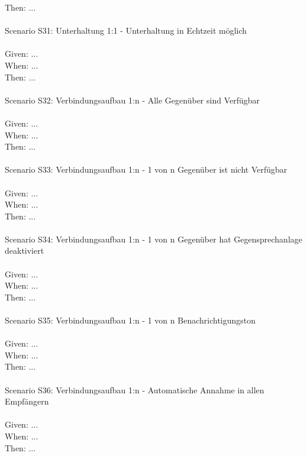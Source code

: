 \begin{tabbing}
    Then:   \> \> \> ...\\
    \\
    Scenario S31: \> \> \> Unterhaltung 1:1 - Unterhaltung in Echtzeit möglich \\ \\
    Given:  \> \> \> ...\\
    When:   \> \> \> ...\\
    Then:   \> \> \> ...\\
    \\
    Scenario S32: \> \> \> Verbindungsaufbau 1:n - Alle Gegenüber sind Verfügbar \\ \\
    Given:  \> \> \> ...\\
    When:   \> \> \> ...\\
    Then:   \> \> \> ...\\
    \\
    Scenario S33: \> \> \> Verbindungsaufbau 1:n - 1 von n Gegenüber ist nicht Verfügbar \\ \\
    Given:  \> \> \> ...\\
    When:   \> \> \> ...\\
    Then:   \> \> \> ...\\
    \\
    Scenario S34: \> \> \> Verbindungsaufbau 1:n - 1 von n Gegenüber hat Gegensprechanlage deaktiviert \\ \\
    Given:  \> \> \> ...\\
    When:   \> \> \> ...\\
    Then:   \> \> \> ...\\
    \\
    Scenario S35: \> \> \> Verbindungsaufbau 1:n - 1 von n Benachrichtigungston \\ \\
    Given:  \> \> \> ...\\
    When:   \> \> \> ...\\
    Then:   \> \> \> ...\\
    \\
    Scenario S36: \> \> \> Verbindungsaufbau 1:n - Automatische Annahme in allen Empfängern \\ \\
    Given:  \> \> \> ...\\
    When:   \> \> \> ...\\
    Then:   \> \> \> ...\\
    \\

\end{tabbing}

